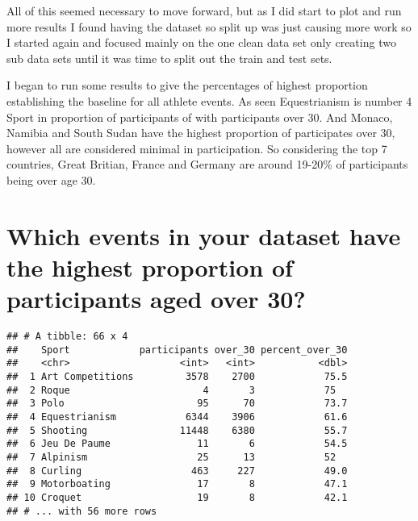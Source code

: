 \documentclass[]{article}
\newenvironment{Shaded}{\begin{snugshade}}{\end{snugshade}}
\newcommand{\KeywordTok}[1]{\textcolor[rgb]{0.13,0.29,0.53}{\textbf{#1}}}
\newcommand{\DataTypeTok}[1]{\textcolor[rgb]{0.13,0.29,0.53}{#1}}
\newcommand{\DecValTok}[1]{\textcolor[rgb]{0.00,0.00,0.81}{#1}}
\newcommand{\StringTok}[1]{\textcolor[rgb]{0.31,0.60,0.02}{#1}}
\newcommand{\OperatorTok}[1]{\textcolor[rgb]{0.81,0.36,0.00}{\textbf{#1}}}
\newcommand{\NormalTok}[1]{#1}
\begin{document}
All of this seemed necessary to move forward, but as I did start to plot
and run more results I found having the dataset so split up was just
causing more work so I started again and focused mainly on the one clean
data set only creating two sub data sets until it was time to split out
the train and test sets.

I began to run some results to give the percentages of highest
proportion establishing the baseline for all athlete events. As seen
Equestrianism is number 4 Sport in proportion of participants of with
participants over 30. And Monaco, Namibia and South Sudan have the
highest proportion of participates over 30, however all are considered
minimal in participation. So considering the top 7 countries, Great
Britian, France and Germany are around 19-20\% of participants being
over age 30.

\section{Which events in your dataset have the highest proportion of
participants aged over
30?}\label{which-events-in-your-dataset-have-the-highest-proportion-of-participants-aged-over-30}

\begin{Shaded}
\end{Shaded}

\begin{verbatim}
## # A tibble: 66 x 4
##    Sport            participants over_30 percent_over_30
##    <chr>                   <int>   <int>           <dbl>
##  1 Art Competitions         3578    2700            75.5
##  2 Roque                       4       3            75  
##  3 Polo                       95      70            73.7
##  4 Equestrianism            6344    3906            61.6
##  5 Shooting                11448    6380            55.7
##  6 Jeu De Paume               11       6            54.5
##  7 Alpinism                   25      13            52  
##  8 Curling                   463     227            49.0
##  9 Motorboating               17       8            47.1
## 10 Croquet                    19       8            42.1
## # ... with 56 more rows
\end{verbatim}
\end{document}
